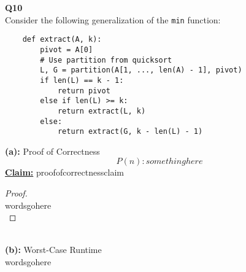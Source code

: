 \documentclass[12pt]{article}
\begin{document}
\textbf{Q10} \\
Consider the following generalization of the \texttt{min} function:
\begin{lstlisting}
    def extract(A, k):
        pivot = A[0]
        # Use partition from quicksort
        L, G = partition(A[1, ..., len(A) - 1], pivot)
        if len(L) == k - 1:
            return pivot
        else if len(L) >= k:
            return extract(L, k)
        else:
            return extract(G, k - len(L) - 1)
\end{lstlisting}
\textbf{(a):} Proof of Correctness \\
\[P(n): somethinghere\]
\textbf{\underline{Claim:}} proofofcorrectnessclaim
\begin{proof}
\leavevmode\\
    wordsgohere \\
\end{proof}
\leavevmode\\
\textbf{(b):} Worst-Case Runtime \\
wordsgohere \\
\\
\pagebreak
\end{document}
